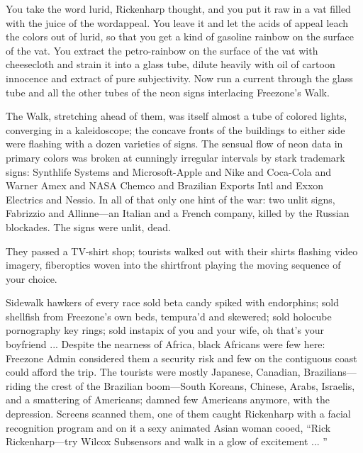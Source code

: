 You take the word lurid, Rickenharp thought, and you put it raw in a vat filled with the juice of the wordappeal. You leave it and let the acids of appeal leach the colors out of lurid, so that you get a kind of gasoline rainbow on the surface of the vat. You extract the petro-rainbow on the surface of the vat with cheesecloth and strain it into a glass tube, dilute heavily with oil of cartoon innocence and extract of pure subjectivity. Now run a current through the glass tube and all the other tubes of the neon signs interlacing Freezone's Walk.

The Walk, stretching ahead of them, was itself almost a tube of colored lights, converging in a kaleidoscope; the concave fronts of the buildings to either side were flashing with a dozen varieties of signs. The sensual flow of neon data in primary colors was broken at cunningly irregular intervals by stark trademark signs: Synthlife Systems and Microsoft-Apple and Nike and Coca-Cola and Warner Amex and NASA Chemco and Brazilian Exports Intl and Exxon Electrics and Nessio. In all of that only one hint of the war: two unlit signs, Fabrizzio and Allinne—an Italian and a French company, killed by the Russian blockades. The signs were unlit, dead.

They passed a TV-shirt shop; tourists walked out with their shirts flashing video imagery, fiberoptics woven into the shirtfront playing the moving sequence of your choice.

Sidewalk hawkers of every race sold beta candy spiked with endorphins; sold shellfish from Freezone's own beds, tempura'd and skewered; sold holocube pornography key rings; sold instapix of you and your wife, oh that's your boyfriend ... Despite the nearness of Africa, black Africans were few here: Freezone Admin considered them a security risk and few on the contiguous coast could afford the trip. The tourists were mostly Japanese, Canadian, Brazilians—riding the crest of the Brazilian boom—South Koreans, Chinese, Arabs, Israelis, and a smattering of Americans; damned few Americans anymore, with the depression. Screens scanned them, one of them caught Rickenharp with a facial recognition program and on it a sexy animated Asian woman cooed, ``Rick Rickenharp—try Wilcox Subsensors and walk in a glow of excitement ... ''

